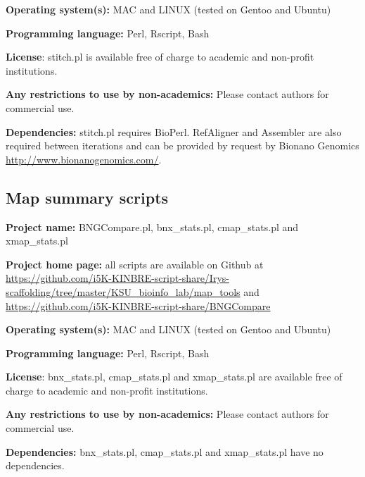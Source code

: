 \documentclass{bmcart}
\begin{document}
\textbf{Operating system(s):} MAC and LINUX (tested on Gentoo and Ubuntu)

\textbf{Programming language:} Perl, Rscript, Bash

\textbf{License}: stitch.pl is available free of charge to academic and non-profit institutions.

\textbf{Any restrictions to use by non-academics:} Please contact authors for commercial use.

\textbf{Dependencies:} stitch.pl requires BioPerl. RefAligner and Assembler are also required between iterations and can be provided by request by Bionano Genomics \url{http://www.bionanogenomics.com/}.

\subsection*{\textbf{Map summary scripts}}

\textbf{Project name:} BNGCompare.pl, bnx\_stats.pl, cmap\_stats.pl and xmap\_stats.pl

\textbf{Project home page:} all scripts are available on Github at \url{https://github.com/i5K-KINBRE-script-share/Irys-scaffolding/tree/master/KSU\_bioinfo\_lab/map\_tools} and \url{https://github.com/i5K-KINBRE-script-share/BNGCompare}

\textbf{Operating system(s):} MAC and LINUX (tested on Gentoo and Ubuntu)

\textbf{Programming language:} Perl, Rscript, Bash

\textbf{License}: bnx\_stats.pl, cmap\_stats.pl and xmap\_stats.pl are available free of charge to academic and non-profit institutions.

\textbf{Any restrictions to use by non-academics:} Please contact authors for commercial use.

\textbf{Dependencies:} bnx\_stats.pl, cmap\_stats.pl and xmap\_stats.pl have no dependencies.

\end{document}
